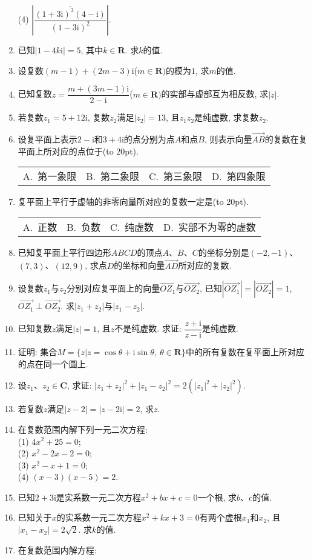 \documentclass[10pt,a4paper]{article}
\newcommand{\bracket}[1]{(\hbox to #1pt{})}
\newcommand{\fourch}[4]{\par\begin{tabular}{p{.23\textwidth}p{.23\textwidth}p{.23\textwidth}p{.23\textwidth}}
A.~#1 &B.~#2& C.~#3& D.~#4
\end{tabular}}
\begin{document}
\begin{enumerate}[1.]
(4) $|\overline{\dfrac{(1+3\mathrm{i})^3(4-\mathrm{i})}{(1-3\mathrm{i})^2}}|$.
\item 已知$|1-4k\mathrm{i}|=5$, 其中$k\in \mathbf{R}$. 求$k$的值.
\item 设复数$(m-1)+(2m-3)\mathrm{i}$($m\in \mathbf{R})$的模为$1$, 求$m$的值.
\item 已知复数$z=\dfrac{m+(3m-1)\mathrm{i}}{2-\mathrm{i}}$($m\in\mathbf{R})$的实部与虚部互为相反数, 求$|z|$.
\item 若复数$z_1=5+12\mathrm{i}$, 复数$z_2$满足$|z_2| =13$, 且$z_1z_2$是纯虚数, 求复数$z_2$.
\item 设复平面上表示$2-\mathrm{i}$和$3+4\mathrm{i}$的点分别为点$A$和点$B$, 则表示向量$\overrightarrow{AB}$的复数在复平面上所对应的点位于\bracket{20}.
\fourch{第一象限}{第二象限}{第三象限}{第四象限}
\item 复平面上平行于虚轴的非零向量所对应的复数一定是\bracket{20}.
\fourch{正数}{负数}{纯虚数}{实部不为零的虚数}
\item 已知复平面上平行四边形$ABCD$的顶点$A$、$B$、$C$的坐标分别是$(-2, -1)$、$(7, 3)$、$(12, 9)$, 求点$D$的坐标和向量$\overrightarrow{AD}$所对应的复数.
\item 设复数$z_1$与$z_2$分别对应复平面上的向量$\overrightarrow{OZ_1}$与$\overrightarrow{OZ_2}$, 已知$|\overrightarrow{OZ_1}|=|\overrightarrow{OZ_2}|=1$, $\overrightarrow{OZ_1}\perp \overrightarrow{OZ_2}$. 求$|z_1+z_2|$与$|z_1-z_2|$.
\item 已知复数$z$满足$|z|=1$, 且$z$不是纯虚数. 求证: $\dfrac{z+\mathrm{i}}{z-\mathrm{i}}$是纯虚数.
\item 证明: 集合$M=\{z|z=\cos \theta +\mathrm{i}\sin \theta,\ \theta \in \mathbf{R}\}$中的所有复数在复平面上所对应的点在同一个圆上.
\item 设$z_1$、$z_2\in \mathbf{C}$, 求证: $|z_1+z_2|^2+|z_1-z_2|^2=2(|z_1|^2+|z_2|^2)$.
\item 若复数$z$满足$|z-2|=|z-2\mathrm{i}|=2$, 求$z$.
\item 在复数范围内解下列一元二次方程:\\
(1) $4x^2+25=0$;\\
(2) $x^2-2x-2=0$;\\
(3) $x^2-x+1=0$;\\
(4) $(x-3)(x-5)=2$.
\item 已知$2+3\mathrm{i}$是实系数一元二次方程$x^2+bx+c=0$一个根, 求$b$、$c$的值.
\item 已知关于$x$的实系数一元二次方程$x^2+kx+3=0$有两个虚根$x_1$和$x_2$, 且$|x_1-x_2|=2\sqrt 2$. 求$k$的值.
\item 在复数范围内解方程:\\

\end{enumerate}
\end{document}
